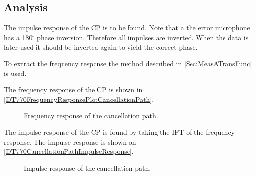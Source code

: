 \subsection{Analysis}
The impulse response of the CP is to be found.
Note that a the error microphone has a 180$^\circ$ phase inversion. Therefore all impulses are inverted. When the data is later used it should be inverted again to yield the correct phase. \cite{michandbook}

To extract the frequency response the method described in \autoref{Sec:MeasATransFunc} is used.

%
%
%

The frequency response of the CP is shown in \autoref{DT770FrequencyResponsePlotCancellationPath}.

\begin{figure}[H]
	\centering
	
	\caption{Frequency response of the cancellation path.}
	\label{DT770FrequencyResponsePlotCancellationPath}
\end{figure}

The impulse response of the CP is found by taking the IFT of the frequency response.
The impulse response is shown on \autoref{DT770CancellationPathImpulseResponse}.

\begin{figure}[H]
	\centering
	
	\caption{Impulse response of the cancellation path.}
	\label{DT770CancellationPathImpulseResponse}
\end{figure}


